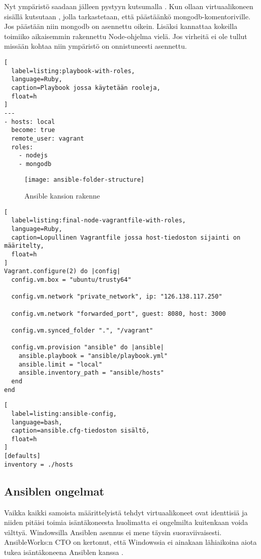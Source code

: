 Nyt ympäristö saadaan jälleen pystyyn kutsumalla . Kun ollaan virtuaalikoneen sisällä kutsutaan , jolla tarkastetaan, että päästäänkö mongodb-komentoriville. Jos päästään niin mongodb on asennettu oikein. Lisäksi kannattaa kokeilla toimiiko aikaisemmin rakennettu Node-ohjelma vielä. Jos virheitä ei ole tullut missään kohtaa niin ympäristö on onnistuneesti asennettu.

\begin{lstlisting}[
  label=listing:playbook-with-roles,
  language=Ruby,
  caption=Playbook jossa käytetään rooleja,
  float=h
]
---
- hosts: local
  become: true
  remote_user: vagrant
  roles:
    - nodejs
    - mongodb
\end{lstlisting}

\begin{figure}[h]
  \texttt{[image: ansible-folder-structure]}
  \caption{Ansible kansion rakenne}
  \label{fig:ansible-folder-structure}
\end{figure}

\begin{lstlisting}[
  label=listing:final-node-vagrantfile-with-roles,
  language=Ruby,
  caption=Lopullinen Vagrantfile jossa host-tiedoston sijainti on määritelty,
  float=h
]
Vagrant.configure(2) do |config|
  config.vm.box = "ubuntu/trusty64"

  config.vm.network "private_network", ip: "126.138.117.250"

  config.vm.network "forwarded_port", guest: 8080, host: 3000

  config.vm.synced_folder ".", "/vagrant"

  config.vm.provision "ansible" do |ansible|
    ansible.playbook = "ansible/playbook.yml"
    ansible.limit = "local"
    ansible.inventory_path = "ansible/hosts"
  end
end
\end{lstlisting}

\begin{lstlisting}[
  label=listing:ansible-config,
  language=bash,
  caption=ansible.cfg-tiedoston sisältö,
  float=h
]
[defaults]
inventory = ./hosts
\end{lstlisting}

\subsection{Ansiblen ongelmat}

Vaikka kaikki samoista määrittelyistä tehdyt virtuaalikoneet ovat identtisiä ja niiden pitäisi toimia isäntäkoneesta huolimatta ei ongelmilta kuitenkaan voida välttyä. Windowsilla Ansiblen asennus ei mene täysin suoraviivaisesti. AnsibleWorks:n CTO on kertonut, että Windowssia ei ainakaan lähiaikoina aiota tukea isäntäkoneena Ansiblen kanssa \cite{link:windows-support-for-ansible}.

